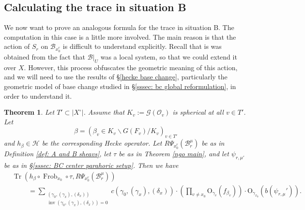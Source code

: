 \documentclass[reqno]{amsart}
\numberwithin{equation}{section}
\newcommand{\Cal}[1]{\mathcal{#1}}
\newcommand{\mrm}[1]{\mathrm{#1}}
\newcommand{\cX}{X^{\circ}}
\DeclareMathOperator{\Frob}{Frob}
\DeclareMathOperator{\Tr}{Tr}
\DeclareMathOperator{\inv}{inv}
\newtheorem{thm}{Theorem}[section]
\theoremstyle{remark}
\numberwithin{equation}{section}
\begin{document}
\subsection{Calculating the trace in situation B}\label{trace B section}
We now want to prove an  analogous formula for the trace in situation B. The computation in this case is a little more involved. The main reason is that the action of $S_r$ on $\Cal{B}_{x_0^r}$ is difficult to understand explicitly. Recall that is was obtained from the fact that $\Cal{B}|_U$ was a local system, so that we could extend it over $X$. However, this process obfuscates the geometric meaning of this action, and we will need to use the results of \S \ref{hecke base change}, particularly the geometric model of base change studied in \S \ref{sssec: bc global reformulation}, in order to understand it. 


\begin{thm}\label{trace situation B}
Let $T' \subset |\cX|$. Assume that $K_v := \Cal{G}(\Cal{O}_v)$ is spherical at all $v \in T'$. Let 
\[
\beta = (\beta_v  \in K_v \backslash G(F_v) /  K_v)_{v \in T'}
\]
and $h_{\beta}  \in \Cal{H}$ be the corresponding Hecke operator. Let $R\Psi_{x_0^r}(\Cal{B}_r^{\mu})$ be as in Definition \ref{def: A and B sheavs}, let $\tau$ be as in Theorem \ref{ngo main}, and let $\psi_{r,\mu'}$ be as in \S \ref{sssec: BC center parahoric setup}. Then we have 
\begin{align*}
&\Tr( h_{\beta} \circ \Frob_{x_0} \circ  \tau , R\Psi_{x_0^r}(\Cal{B}_r^{\mu}))  \\
& \hspace{1cm} =   \sum_{\substack{ (\gamma_0, (\gamma_x),(\delta_x)) \\ \inv(\gamma_0, (\gamma_x),(\delta_x) ) = 0  }} 
c(\gamma_0, (\gamma_x), (\delta_x))   \cdot  \left(\prod_{v \neq x_0} \mrm{O}_{\gamma_v}(f_{\beta_v}) \right) \cdot \mrm{O}_{\gamma_{x_0} }(b(\psi_{r,\mu}')).
\end{align*}
\end{thm}
\end{document}
